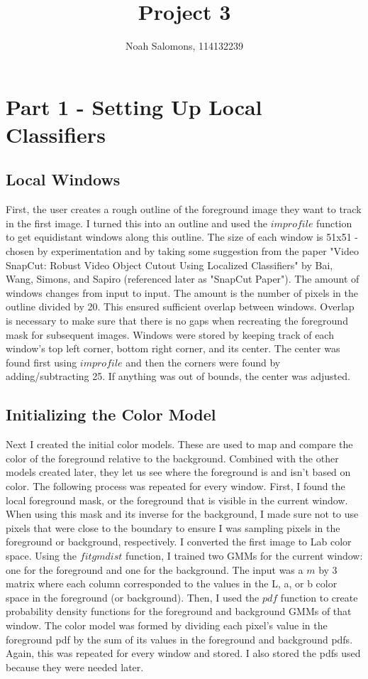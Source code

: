 \documentclass[10pt]{article}
\title{Project 3}
\author{Noah Salomons, 114132239}
\begin{document}
\maketitle

\section{Part 1 - Setting Up Local Classifiers}
\subsection{Local Windows}
First, the user creates a rough outline of the foreground image they want to track in the first image. I turned this into an outline and used the $improfile$ function to get equidistant windows along this outline. The size of each window is 51x51 - chosen by experimentation and by taking some suggestion from the paper "Video SnapCut: Robust Video Object Cutout Using Localized Classifiers" by Bai, Wang, Simons, and Sapiro (referenced later as "SnapCut Paper"). The amount of windows changes from input to input. The amount is the number of pixels in the outline divided by 20. This ensured sufficient overlap between windows. Overlap is necessary to make sure that there is no gaps when recreating the foreground mask for subsequent images. Windows were stored by keeping track of each window's top left corner, bottom right corner, and its center. The center was found first using $improfile$ and then the corners were found by adding/subtracting 25. If anything was out of bounds, the center was adjusted.
\subsection{Initializing the Color Model}
Next I created the initial color models. These are used to map and compare the color of the foreground relative to the background. Combined with the other models created later, they let us see where the foreground is and isn't based on color. The following process was repeated for every window. First, I found the local foreground mask, or the foreground that is visible in the current window. When using this mask and its inverse for the background, I made sure not to use pixels that were close to the boundary to ensure I was sampling pixels in the foreground or background, respectively. I converted the first image to Lab color space. Using the $fitgmdist$ function, I trained two GMMs for the current window: one for the foreground and one for the background. The input was a $m$ by 3 matrix where each column corresponded to the values in the L, a, or b color space in the foreground (or background). Then, I used the $pdf$ function to create probability density functions for the foreground and background GMMs of that window. The color model was formed by dividing each pixel's value in the foreground pdf by the sum of its values in the foreground and background pdfs. Again, this was repeated for every window and stored. I also stored the pdfs used because they were needed later.
\end{document}
